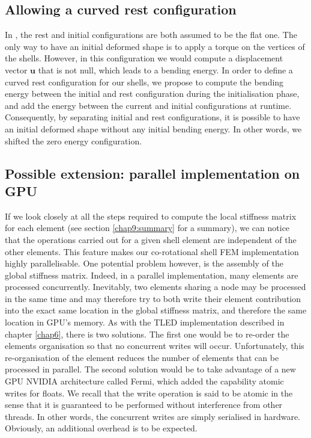 \subsection{Allowing a curved rest configuration}
In \cite{Przemieniecki85}, the rest and initial configurations are both assumed to be the flat one. The only way to have an initial deformed shape is to apply a torque on the vertices of the shells. However, in this configuration we would compute a displacement vector $ \mathbf{u} $ that is not null, which leads to a bending energy. In order to define a curved rest configuration for our shells, we propose to compute the bending energy between the initial and rest configuration during the initialisation phase, and add the energy between the current and initial configurations at runtime. Consequently, by separating initial and rest configurations, it is possible to have an initial deformed shape without any initial bending energy. In other words, we shifted the zero energy configuration.


\subsection{Possible extension: parallel implementation on GPU}	\label{chap9:GPU}
If we look closely at all the steps required to compute the local stiffness matrix for each element (see section \ref{chap9:summary} for a summary), we can notice that the operations carried out for a given shell element are independent of the other elements. This feature makes our co-rotational shell FEM implementation highly parallelisable. One potential problem however, is the assembly of the global stiffness matrix. Indeed, in a parallel implementation, many elements are processed concurrently. Inevitably, two elements sharing a node may be processed in the same time and may therefore try to both write their element contribution into the exact same location in the global stiffness matrix, and therefore the same location in GPU's memory. As with the TLED implementation described in chapter \ref{chap6}, there is two solutions. The first one would be to re-order the elements organisation so that no concurrent writes will occur. Unfortunately, this re-organisation of the element reduces the number of elements that can be processed in parallel. The second solution would be to take advantage of a new GPU NVIDIA architecture called Fermi, which added the capability atomic writes for floats. We recall that the write operation is said to be atomic in the sense that it is guaranteed to be performed without interference from other threads. In other words, the concurrent writes are simply serialised in hardware. Obviously, an additional overhead is to be expected. 

